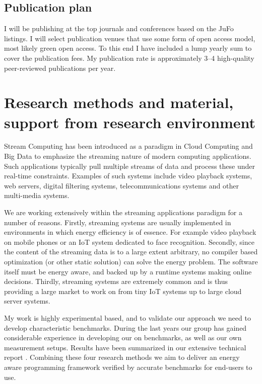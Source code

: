 \documentclass{article}
\begin{document}
\subsection{Publication plan}
I will be publishing at the top journals and conferences based on the JuFo listings. I will select publication venues that use some form of open access model, most likely green open access. 
To this end I have included a lump yearly sum to cover the publication fees. My publication rate is approximately 3--4 high-quality peer-reviewed publications per year.

\section{Research methods and material, support from research environment}
Stream Computing has been introduced as a paradigm in Cloud Computing and Big Data to emphasize the streaming nature of modern computing applications. 
Such applications typically pull multiple streams of data and process these under real-time constraints. 
Examples of such systems include video playback systems, web servers, digital filtering systems, telecommunications systems and other multi-media systems. 

We are working extensively within the streaming applications paradigm for a number of reasons. 
Firstly, streaming systems are usually implemented in environments in which energy efficiency is of essence. 
For example video playback on mobile phones or an IoT system dedicated to face recognition. 
Secondly, since the content of the streaming data is to a large extent arbitrary, no compiler based optimization (or other static solution) can solve the energy problem. 
The software itself must be energy aware, and backed up by a runtime systems making online decisions. 
Thirdly, streaming systems are extremely common and is thus providing a large market to work on from tiny IoT systems up to large cloud server systems.

My work is highly experimental based, and to validate our approach we need to develop characteristic benchmarks. 
During the last years our group has gained considerable experience in developing our on benchmarks, as well as our own measurement setups. 
Results have been summarized in our extensive technical report \cite{HolmbackaTechrep}. 
Combining these four research methods we aim to deliver an energy aware programming framework verified by accurate benchmarks for end-users to use.
\end{document}
